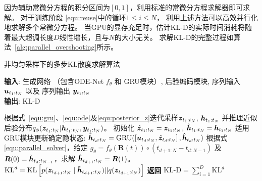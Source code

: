 因为辅助常微分方程的积分区间为$[0,1]$，利用标准的常微分方程求解器即可求解。
对于训练阶段
\eqref{equ:reuse}中的循环$1\leq i\leq N$，
利用上述方法可以高效并行化地求解多个常微分方程。
当GPU的显存充足时，估计KL-D的实际时间消耗将随着最大超调长度$D$线性增长，且与$N$的大小无关。
求解KL-D的完整过程如算法~\ref{alg:parallel_overshooting}所示。
\begin{algorithm}[tb]
    \caption{非均匀采样下的多步KL散度求解算法}
    \label{alg:parallel_overshooting}
    \textbf{输入}: 生成网络 （包含ODE-Net $f_\theta$ 和 GRU模块）, 后验编码模块, 序列输入 $\boldsymbol u_{t_1:t_N}$ 以及 序列输出 $\boldsymbol y_{t_1:t_N}$\\
    \textbf{输出}: $\text{KL-D}$ 
    \begin{algorithmic}[1] %
    \State 根据式~\eqref{equ:gru}、\eqref{equ:ode}及\eqref{equ:posterior_z}迭代采样$\boldsymbol{z}_{t_1:t_N}$, $\boldsymbol{{h}}_{t_1:t_N}$ 并推理近似后验分布$q_{\phi}(\boldsymbol z_{t_1:t_N}|\boldsymbol h_{t_1:t_N}, \boldsymbol y_{t_1:t_N})$。
    \State 初始化 $\hat{\boldsymbol{z}}_{t_1:t_N}=\boldsymbol{z}_{t_1:t_N}$, $\hat{\boldsymbol{h}}_{t_1:t_N}=\boldsymbol{h}_{t_1:t_N}$
    \State 适用GRU模块更新确定隐状态: 
    $\tilde{\boldsymbol{h}}_{t_d:t_N}=\text{GRU}(\left [\boldsymbol{u}_{t_d:t_N}, \hat{\boldsymbol{z}}_{t_d:t_N}\right], \boldsymbol{{\hat h}}_{t_d:t_N})$
    \State 根据式\eqref{equ:parallel_solver}，给定 $g_{\theta}=f_{\theta}(\boldsymbol{R}(t)) \circ\left(t_{d+1:N}-t_{d:N-1}\right)$ 及 $\boldsymbol{R}(0)=\tilde{\boldsymbol{h}}_{t_d:t_{N-1}}$，求解 $\boldsymbol{{\hat h}}_{t_{d+1}:t_{N}}=\boldsymbol{R}(1)$。
    \State $\text{KL}^d= \text{KL}\left[p(\boldsymbol{z}_{t_{d+1}:t_{N}}\mid \boldsymbol{{\hat h}}_{t_{d+1}:t_{N}})||q(\boldsymbol{z}_{t_{d+1}:t_N})\right]$
    \EndFor
    \State \textbf{返回} $\text{KL-D} = \sum_{i=1}^{D}\text{KL}^d$ 
    \end{algorithmic}
    \end{algorithm}

